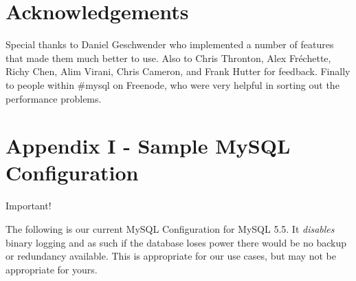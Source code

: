 \documentclass[11pt,letterpaper,oneside]{article}
\begin{document}
\section{Acknowledgements}

Special thanks to Daniel Geschwender who implemented a number of features that made them much better to use. Also to Chris Thronton, Alex Fr\'echette, Richy Chen, Alim Virani, Chris Cameron, and Frank Hutter for feedback. Finally to people within \#mysql on Freenode, who were very helpful in sorting out the performance problems.


\section{Appendix I - Sample MySQL Configuration} 
\label{appendix:sampleconf}

\begin{bclogo}[logo=\bcattention, couleurBarre=red, noborder=true]{Important!}

The following is our current MySQL Configuration for MySQL 5.5. It \emph{disables} binary logging and as such if the database loses power there would be no backup or redundancy available. This is appropriate for our use cases, but may not be appropriate for yours.

\end{bclogo}
\end{document}
